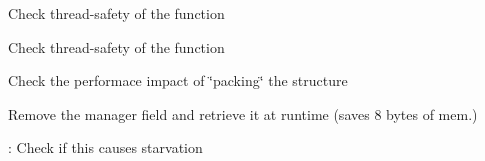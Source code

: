 
\begin{DoxyRefList}
\item[Global \mbox{\hyperlink{message_8c_aaa0bbdede7f7c74403859a3e2d367aee}{copy\+\_\+msg\+\_\+from\+\_\+user}} (msg\+\_\+t $\ast$kmsg, const int8\+\_\+t $\ast$umsg, const ssize\+\_\+t \+\_\+size)]\label{todo__todo000005}%
%
Check thread-\/safety of the function  
\item[Global \mbox{\hyperlink{message_8c_a02620253a55902a0dc6e793191a678a8}{copy\+\_\+msg\+\_\+to\+\_\+user}} (const msg\+\_\+t $\ast$kmsg, \+\_\+\+\_\+user int8\+\_\+t $\ast$ubuffer, const ssize\+\_\+t \+\_\+size)]\label{todo__todo000004}%
%
Check thread-\/safety of the function  
\item[Class \mbox{\hyperlink{structgroup__flags__t}{group\+\_\+flags\+\_\+t}} ]\label{todo__todo000007}%
%
Check the performace impact of \char`\"{}packing\char`\"{} the structure 
\item[Class \mbox{\hyperlink{structt__message__delayed__deliver}{t\+\_\+message\+\_\+delayed\+\_\+deliver}} ]\label{todo__todo000006}%
%
Remove the \textquotesingle{}manager\textquotesingle{} field and retrieve it at runtime (saves 8 bytes of mem.)  
\item[Global \mbox{\hyperlink{group__manager_8c_a7a4a1f2ed5563df3defd7477a8f70168}{unregister\+Group\+Device}} (\mbox{\hyperlink{structgroup__data}{group\+\_\+data}} $\ast$grp\+\_\+data, bool flag)]\label{todo__todo000001}%
%
\+: Check if this causes starvation 
\end{DoxyRefList}